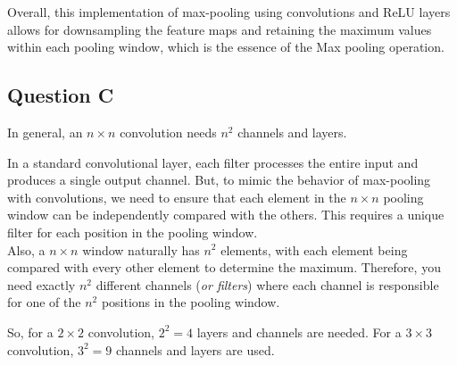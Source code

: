 Overall, this implementation of max-pooling using convolutions and ReLU layers allows for downsampling the feature maps and retaining the maximum values within each pooling window, which is the essence of the Max pooling operation.
\vspace{3mm}

\subsection{Question C}

In general, an $n \times n$ convolution needs $n^2$ channels and layers.

In a standard convolutional layer, each filter processes the entire input and produces a single output channel.
But, to mimic the behavior of max-pooling with convolutions, we need to ensure that each element in the $n \times n$ pooling window can be independently compared with the others. This requires a unique filter for each position in the pooling window.\\

Also, a $n \times n$ window naturally has $n^2$ elements, with each element being compared with every other element to determine the maximum. Therefore, you need exactly $n^2$ different channels (\textit{or filters}) where each channel is responsible for one of the $n^2$ positions in the pooling window. 

So, for a $2 \times 2$ convolution, \underline{$2^2 = 4$} layers and channels are needed.
For a $3 \times 3$ convolution, \underline{$3^2 = 9$} channels and layers are used.
\vspace{3mm}